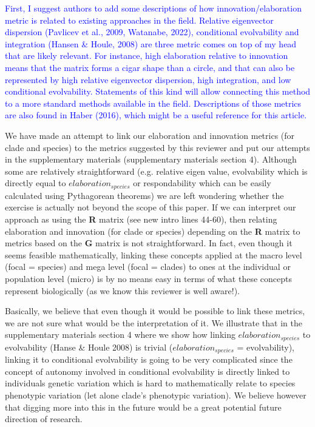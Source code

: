 \documentclass[12pt,letterpaper]{article}
\begin{document}
{\textcolor{blue}{First, I suggest authors to add some descriptions of how innovation/elaboration metric is related to existing approaches in the field. Relative eigenvector dispersion (Pavlicev et al., 2009, Watanabe, 2022), conditional evolvability and integration (Hansen \& Houle, 2008) are three metric comes on top of my head that are likely relevant. For instance, high elaboration relative to innovation means that the matrix forms a cigar shape than a circle, and that can also be represented by high relative eigenvector dispersion, high integration, and low conditional evolvability. Statements of this kind will allow connecting this method to a more standard methods available in the field. Descriptions of those metrics are also found in Haber (2016), which might be a useful reference for this article.}

We have made an attempt to link our elaboration and innovation metrics (for clade and species) to the metrics suggested by this reviewer and put our attempts in the supplementary materials (supplementary materials section 4). Although some are relatively straightforward (e.g. relative eigen value, evolvability which is directly equal to $elaboration_{species}$ or respondability which can be easily calculated using Pythagorean theorems) we are left wondering whether the exercise is actually not beyond the scope of this paper. If we can interpret our approach as using the \textbf{R} matrix (see new intro lines 44-60), then relating elaboration and innovation (for clade or species) depending on the \textbf{R} matrix to metrics based on the \textbf{G} matrix is not straightforward. In fact, even though it seems feasible mathematically, linking these concepts applied at the macro level (focal = species) and mega level (focal = clades) to ones at the individual or population level (micro) is by no means easy in terms of what these concepts represent biologically (as we know this reviewer is well aware!).

Basically, we believe that even though it would be possible to link these metrics, we are not sure what would be the interpretation of it. We illustrate that in the supplementary materials section 4 where we show how linking $elaboration_{species}$ to evolvability (Hanse \& Houle 2008) is trivial ($elaboration_{species}$ = evolvability), linking it to conditional evolvability is going to be very complicated since the concept of autonomy involved in conditional evolvability is directly linked to individuals genetic variation which is hard to mathematically relate to species phenotypic variation (let alone clade’s phenotypic variation). We believe however that digging more into this in the future would be a great potential future direction of research.

}
\end{document}
